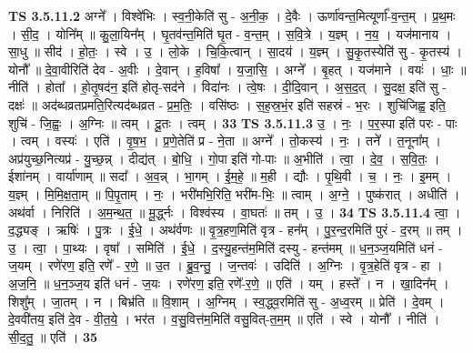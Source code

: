 \documentclass[17pt]{extarticle}
\begin{document}
                  \newline
                                \textbf{ TS 3.5.11.2} \newline
                  अग्ने᳚ । विश्वे॑भिः । स्व॒नी॒केति॑ सु - अ॒नी॒क॒ । दे॒वैः । ऊर्णा॑वन्त॒मित्यूर्णा᳚-व॒न्त॒म् । प्र॒थ॒मः । सी॒द॒ । योनि᳚म् ॥ कु॒ला॒यिन᳚म् । घृ॒तव॑न्त॒मिति॑ घृ॒त - व॒न्त॒म् । स॒वि॒त्रे । य॒ज्ञ्म् । न॒य॒ । यज॑मानाय । सा॒धु ॥ सीद॑ । हो॒तः॒ । स्वे । उ॒ । लो॒के । चि॒कि॒त्वान् । सा॒दय॑ । य॒ज्ञ्म् । सु॒कृ॒तस्येति॑ सु - कृ॒तस्य॑ । योनौ᳚ ॥ दे॒वा॒वीरिति॑ देव - अ॒वीः । दे॒वान् । ह॒विषा᳚ । य॒जा॒सि॒ । अग्ने᳚ । बृ॒हत् । यज॑माने । वयः॑ । धाः॒ ॥ नीति॑ । होता᳚ । हो॒तृ॒षद॑न॒ इति॑ होतृ-सद॑ने । विदा॑नः । त्वे॒षः । दी॒दि॒वान् । अ॒स॒द॒त् । सु॒दक्ष॒ इति॑ सु - दक्षः॑ ॥ अद॑ब्धव्रतप्रमति॒रित्यद॑ब्धव्रत - प्र॒म॒तिः॒ । वसि॑ष्ठः । स॒ह॒स्र॒भं॒र इति॑ सहस्रं - भ॒रः । शुचि॑जिह्व॒ इति॒ शुचि॑ - जि॒ह्वः॒ । अ॒ग्निः ॥ त्वम् । दू॒तः । त्वम् । \textbf{  33} \newline
                  \newline
                                \textbf{ TS 3.5.11.3} \newline
                  उ॒ । नः॒ । प॒र॒स्पा इति॑ परः - पाः । त्वम् । वस्यः॑ । एति॑ । वृ॒ष॒भ॒ । प्र॒णे॒तेति॑ प्र - ने॒ता ॥ अग्ने᳚ । तो॒कस्य॑ । नः॒ । तने᳚ । त॒नूना᳚म् । अप्र॑युच्छ॒नित्यप्र॑ - यु॒च्छ॒न्न् । दीद्य॑त् । बो॒धि॒ । गो॒पा इति॑ गो-पाः ॥ अ॒भीति॑ । त्वा॒ । दे॒व॒ । स॒वि॒तः॒ । ईशा॑नम् । वार्या॑णाम् ॥ सदा᳚ । अ॒व॒न्न् । भा॒गम् । ई॒म॒हे॒ ॥ म॒ही । द्यौः । पृ॒थि॒वी । च॒ । नः॒ । इ॒मम् । य॒ज्ञ्म् । मि॒मि॒क्ष॒ता॒म् ॥ पि॒पृ॒ताम् । नः॒ । भरी॑मभि॒रिति॒ भरी॑म-भिः॒ ॥ त्वाम् । अ॒ग्ने॒ । पुष्क॑रात् । अधीति॑ । अथ॑र्वा । निरिति॑ । अ॒म॒न्थ॒त॒ ॥ मू॒र्द्ध्नः । विश्व॑स्य । वा॒घतः॑ ॥ तम् । उ॒ । \textbf{  34} \newline
                  \newline
                                \textbf{ TS 3.5.11.4} \newline
                  त्वा॒ । द॒द्ध्यङ् । ऋषिः॑ । पु॒त्रः । ई॒धे॒ । अथ॑र्वणः ॥ वृ॒त्र॒हण॒मिति॑ वृत्र - हन᳚म् । पु॒र॒न्द॒रमिति॑ पुरं - द॒रम् ॥ तम् । उ॒ । त्वा॒ । पा॒थ्यः । वृषा᳚ । समिति॑ । ई॒धे॒ । द॒स्यु॒हन्त॑म॒मिति॑ दस्यु - हन्त॑मम् ॥ ध॒न॒ञ्ज॒यमिति॑ धनं - ज॒यम् । रणे॑रण॒ इति॒ रणे᳚ - र॒णे॒ ॥ उ॒त । ब्रु॒व॒न्तु॒ । ज॒न्तवः॑ । उदिति॑ । अ॒ग्निः । वृ॒त्र॒हेति॑ वृत्र - हा । अ॒ज॒नि॒ ॥ ध॒न॒ञ्ज॒य इति॑ धनं - ज॒यः । रणे॑रण॒ इति॒ रणे᳚-र॒णे॒ ॥ एति॑ । यम् । हस्ते᳚ । न । खा॒दिन᳚म् । शिशु᳚म् । जा॒तम् । न । बिभ्र॑ति ॥ वि॒शाम् । अ॒ग्निम् । स्व॒द्ध्व॒रमिति॑ सु - अ॒ध्व॒रम् ॥ प्रेति॑ । दे॒वम् । दे॒ववी॑तय॒ इति॑ दे॒व - वी॒त॒ये॒ । भर॑त । व॒सु॒वित्त॑म॒मिति॑ वसु॒वित्-त॒म॒म् ॥ एति॑ । स्वे । योनौ᳚ । नीति॑ । सी॒द॒तु॒ ॥ एति॑ । \textbf{  35} \newline
\end{document}

